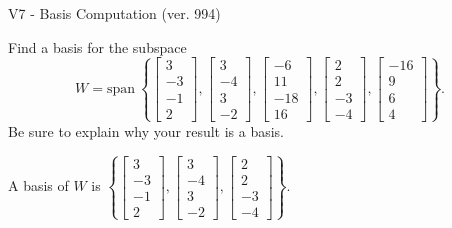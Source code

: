\begin{exercise}
  \begin{exerciseTitle}V7 - Basis Computation (ver. 994)\end{exerciseTitle}
  \begin{exerciseStatement}
    Find a basis for the subspace 
\[W=\mathrm{span}\ \left\{\left[\begin{array}{r}
3 \\
-3 \\
-1 \\
2
\end{array}\right] , \left[\begin{array}{r}
3 \\
-4 \\
3 \\
-2
\end{array}\right] , \left[\begin{array}{r}
-6 \\
11 \\
-18 \\
16
\end{array}\right] , \left[\begin{array}{r}
2 \\
2 \\
-3 \\
-4
\end{array}\right] , \left[\begin{array}{r}
-16 \\
9 \\
6 \\
4
\end{array}\right]\right\}.\]
 Be sure to explain why your result is a basis.


  \end{exerciseStatement}
  \begin{exerciseAnswer}
   A basis of \(W\) is  \(\left\{\left[\begin{array}{r}
3 \\
-3 \\
-1 \\
2
\end{array}\right] , \left[\begin{array}{r}
3 \\
-4 \\
3 \\
-2
\end{array}\right] , \left[\begin{array}{r}
2 \\
2 \\
-3 \\
-4
\end{array}\right]\right\}\).
  


  \end{exerciseAnswer}
\end{exercise}
